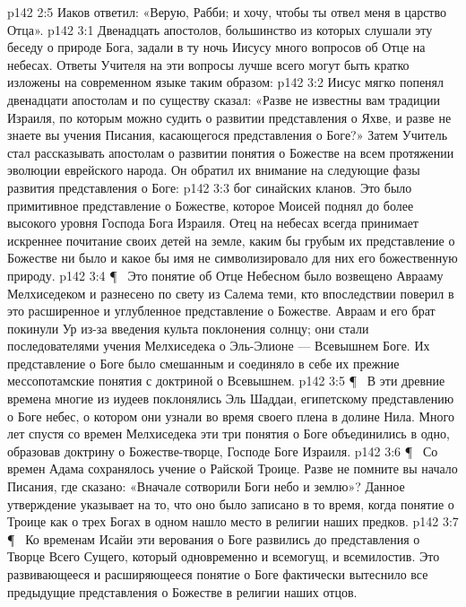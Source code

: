 \vs p142 2:5 Иаков ответил: «Верую, Рабби; и хочу, чтобы ты отвел меня в царство Отца».
\vs p142 3:1 Двенадцать апостолов, большинство из которых слушали эту беседу о природе Бога, задали в ту ночь Иисусу много вопросов об Отце на небесах. Ответы Учителя на эти вопросы лучше всего могут быть кратко изложены на современном языке таким образом:
\vs p142 3:2 Иисус мягко попенял двенадцати апостолам и по существу сказал: «Разве не известны вам традиции Израиля, по которым можно судить о развитии представления о Яхве, и разве не знаете вы учения Писания, касающегося представления о Боге?» Затем Учитель стал рассказывать апостолам о развитии понятия о Божестве на всем протяжении эволюции еврейского народа. Он обратил их внимание на следующие фазы развития представления о Боге:
\vs p142 3:3 \bibnobreakspace {} бог синайских кланов. Это было примитивное представление о Божестве, которое Моисей поднял до более высокого уровня Господа Бога Израиля. Отец на небесах всегда принимает искреннее почитание своих детей на земле, каким бы грубым их представление о Божестве ни было и какое бы имя не символизировало для них его божественную природу.
\vs p142 3:4 \P\ \bibnobreakspace {} Это понятие об Отце Небесном было возвещено Аврааму Мелхиседеком и разнесено по свету из Салема теми, кто впоследствии поверил в это расширенное и углубленное представление о Божестве. Авраам и его брат покинули Ур из\hyp{}за введения культа поклонения солнцу; они стали последователями учения Мелхиседека о Эль\hyp{}Элионе --- Всевышнем Боге. Их представление о Боге было смешанным и соединяло в себе их прежние мессопотамские понятия с доктриной о Всевышнем.
\vs p142 3:5 \P\ \bibnobreakspace {} В эти древние времена многие из иудеев поклонялись Эль Шаддаи, египетскому представлению о Боге небес, о котором они узнали во время своего плена в долине Нила. Много лет спустя со времен Мелхиседека эти три понятия о Боге объединились в одно, образовав доктрину о Божестве\hyp{}творце, Господе Боге Израиля.
\vs p142 3:6 \P\ \bibnobreakspace {} Со времен Адама сохранялось учение о Райской Троице. Разве не помните вы начало Писания, где сказано: «Вначале сотворили Боги небо и землю»? Данное утверждение указывает на то, что оно было записано в то время, когда понятие о Троице как о трех Богах в одном нашло место в религии наших предков.
\vs p142 3:7 \P\ \bibnobreakspace {} Ко временам Исайи эти верования о Боге развились до представления о Творце Всего Сущего, который одновременно и всемогущ, и всемилостив. Это развивающееся и расширяющееся понятие о Боге фактически вытеснило все предыдущие представления о Божестве в религии наших отцов.
